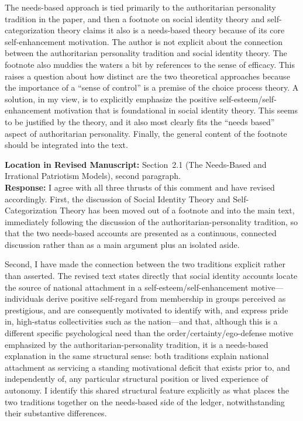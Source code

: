 \documentclass[11pt]{article}
\begin{document}
\begin{reviewercomment}
The needs-based approach is tied primarily to the authoritarian personality tradition in the paper, and then a footnote on social identity theory and self-categorization theory claims it also is a needs-based theory because of its core self-enhancement motivation. The author is not explicit about the connection between the authoritarian personality tradition and social identity theory. The footnote also muddies the waters a bit by references to the sense of efficacy. This raises a question about how distinct are the two theoretical approaches because the importance of a ``sense of control'' is a premise of the choice process theory. A solution, in my view, is to explicitly emphasize the positive self-esteem/self-enhancement motivation that is foundational in social identity theory. This seems to be justified by the theory, and it also most clearly fits the ``needs based'' aspect of authoritarian personality. Finally, the general content of the footnote should be integrated into the text.
\end{reviewercomment}

\noindent\textbf{Location in Revised Manuscript:} Section~2.1 (The Needs-Based and Irrational Patriotism Models), second paragraph.\\[4pt]
\textbf{Response:} I agree with all three thrusts of this comment and have revised accordingly. First, the discussion of Social Identity Theory and Self-Categorization Theory has been moved out of a footnote and into the main text, immediately following the discussion of the authoritarian-personality tradition, so that the two needs-based accounts are presented as a continuous, connected discussion rather than as a main argument plus an isolated aside.

Second, I have made the connection between the two traditions explicit rather than asserted. The revised text states directly that social identity accounts locate the source of national attachment in a self-esteem/self-enhancement motive---individuals derive positive self-regard from membership in groups perceived as prestigious, and are consequently motivated to identify with, and express pride in, high-status collectivities such as the nation---and that, although this is a different specific psychological need than the order/certainty/ego-defense motive emphasized by the authoritarian-personality tradition, it is a needs-based explanation in the same structural sense: both traditions explain national attachment as servicing a standing motivational deficit that exists prior to, and independently of, any particular structural position or lived experience of autonomy. I identify this shared structural feature explicitly as what places the two traditions together on the needs-based side of the ledger, notwithstanding their substantive differences.
\end{document}
